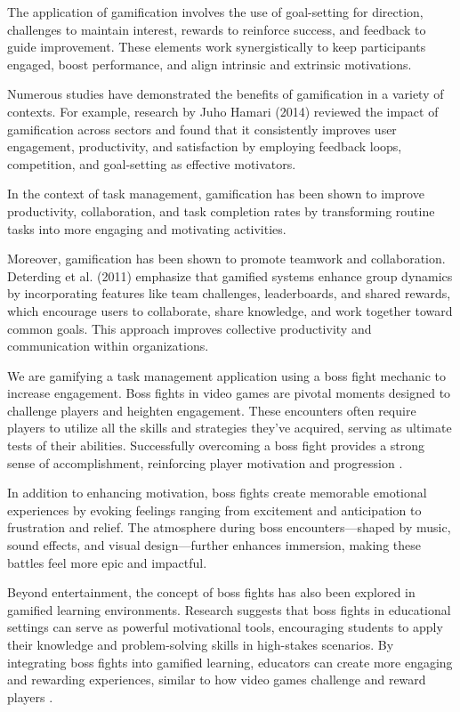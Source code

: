     The application of gamification involves the use of goal-setting for direction, challenges to maintain interest, rewards to reinforce success, and feedback to guide improvement. These elements work synergistically to keep participants engaged, boost performance, and align intrinsic and extrinsic motivations. \cite{Game:Reward}

    Numerous studies have demonstrated the benefits of gamification in a variety of contexts. For example, research by Juho Hamari (2014) reviewed the impact of gamification across sectors and found that it consistently improves user engagement, productivity, and satisfaction by employing feedback loops, competition, and goal-setting as effective motivators. \cite{6758978}

    In the context of task management, gamification has been shown to improve productivity, collaboration, and task completion rates by transforming routine tasks into more engaging and motivating activities.

    Moreover, gamification has been shown to promote teamwork and collaboration. Deterding et al. (2011) emphasize that gamified systems enhance group dynamics by incorporating features like team challenges, leaderboards, and shared rewards, which encourage users to collaborate, share knowledge, and work together toward common goals. This approach improves collective productivity and communication within organizations. \cite{gamification:designElement}

    We are gamifying a task management application using a boss fight mechanic to increase engagement. Boss fights in video games are pivotal moments designed to challenge players and heighten engagement. These encounters often require players to utilize all the skills and strategies they've acquired, serving as ultimate tests of their abilities. Successfully overcoming a boss fight provides a strong sense of accomplishment, reinforcing player motivation and progression \cite{toxigon:bossFight}.

    In addition to enhancing motivation, boss fights create memorable emotional experiences by evoking feelings ranging from excitement and anticipation to frustration and relief. The atmosphere during boss encounters—shaped by music, sound effects, and visual design—further enhances immersion, making these battles feel more epic and impactful. \cite{toxigon:bossFight}

    Beyond entertainment, the concept of boss fights has also been explored in gamified learning environments. Research suggests that boss fights in educational settings can serve as powerful motivational tools, encouraging students to apply their knowledge and problem-solving skills in high-stakes scenarios. By integrating boss fights into gamified learning, educators can create more engaging and rewarding experiences, similar to how video games challenge and reward players \cite{gamification:Education}.

